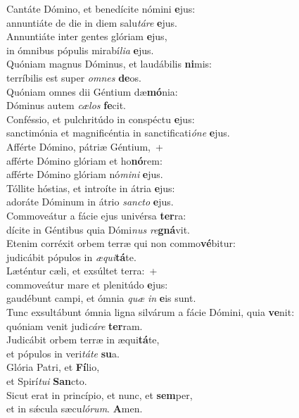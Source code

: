 \evenverse Cantáte Dómino, et benedícite nómini \textbf{e}jus:~\*\\
\evenverse annuntiáte de die in diem salu\textit{tá}\textit{re} \textbf{e}jus.\\
\oddverse Annuntiáte inter gentes glóriam \textbf{e}jus,~\*\\
\oddverse in ómnibus pópulis mirabí\textit{li}\textit{a} \textbf{e}jus.\\
\evenverse Quóniam magnus Dóminus, et laudábilis \textbf{ni}mis:~\*\\
\evenverse terríbilis est super \textit{om}\textit{nes} \textbf{de}os.\\
\oddverse Quóniam omnes dii Géntium dæ\textbf{mó}nia:~\*\\
\oddverse Dóminus autem \textit{cæ}\textit{los} \textbf{fe}cit.\\
\evenverse Conféssio, et pulchritúdo in conspéctu \textbf{e}jus:~\*\\
\evenverse sanctimónia et magnificéntia in sanctificati\textit{ó}\textit{ne} \textbf{e}jus.\\
\oddverse Afférte Dómino, pátriæ Géntium,~+\\
\oddverse  afférte Dómino glóriam et ho\textbf{nó}rem:~\*\\
\oddverse afférte Dómino glóriam nó\textit{mi}\textit{ni} \textbf{e}jus.\\
\evenverse Tóllite hóstias, et introíte in átria \textbf{e}jus:~\*\\
\evenverse adoráte Dóminum in átrio \textit{san}\textit{cto} \textbf{e}jus.\\
\oddverse Commoveátur a fácie ejus univérsa \textbf{ter}ra:~\*\\
\oddverse dícite in Géntibus quia Dómi\textit{nus} \textit{re}\textbf{gná}vit.\\
\evenverse Etenim corréxit orbem terræ qui non commo\textbf{vé}bitur:~\*\\
\evenverse judicábit pópulos in \textit{æ}\textit{qui}\textbf{tá}te.\\
\oddverse Læténtur cæli, et exsúltet terra:~+\\
\oddverse  commoveátur mare et plenitúdo \textbf{e}jus:~\*\\
\oddverse gaudébunt campi, et ómnia \textit{quæ} \textit{in} \textbf{e}is sunt.\\
\evenverse Tunc exsultábunt ómnia ligna silvárum a fácie Dómini, quia \textbf{ve}nit:~\*\\
\evenverse quóniam venit judi\textit{cá}\textit{re} \textbf{ter}ram.\\
\oddverse Judicábit orbem terræ in æqui\textbf{tá}te,~\*\\
\oddverse et pópulos in veri\textit{tá}\textit{te} \textbf{su}a.\\
\evenverse Glória Patri, et \textbf{Fí}lio,~\*\\
\evenverse et Spirí\textit{tu}\textit{i} \textbf{San}cto.\\
\oddverse Sicut erat in princípio, et nunc, et \textbf{sem}per,~\*\\
\oddverse et in sǽcula sæcu\textit{ló}\textit{rum}. \textbf{A}men.\\
